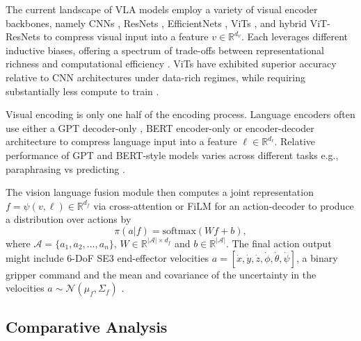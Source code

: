 The current landscape of \ac{VLA} models employ a variety of visual encoder backbones, namely \acp{CNN} \cite{MCIL2021,HULC2022,HULC++2022,PERACT2023, MTACT2024,OCTO2024}, ResNets \cite{CLIPORT2022,ACT3D2023,RVT2023,RVT22024,BCZ2022,ACT2023,DIFFPOLICY2023,SUDD2023, INTLANG2023, GATO2022}, EfficientNets \cite{QTRANSFORMER2023,RTTRAJ2023, RT12022}, \acp{ViT} \cite{LANGCOSTS2022,ROBOPOINT2024,VIMA2023,FLAMINGO2024,VOXPOSER2023,RTH2024,RTX2024, PI02024, OPENVLA2024, GR00T2025}, and hybrid \ac{ViT}-ResNets \cite{MDT2024} to compress visual input into a feature $v \in \mathbb R^{d_v}$. Each leverages different inductive biases, offering a spectrum of trade-offs between representational richness and computational efficiency \cite{VLASURVEY2025}. \acp{ViT} have exhibited superior accuracy relative to \ac{CNN} architectures under data-rich regimes, while requiring substantially less compute to train \cite{16x162021}. 

Visual encoding is only one half of the encoding process. Language encoders often use either a \ac{GPT} decoder-only \cite{CLIPORT2022, LANGCOSTS2022, INTLANG2023, PERACT2023, ACT3D2023, RVT2023, RVT22024, ROBOPOINT2024, FLAMINGO2024, VOXPOSER2023, SUDD2023, MDT2024}, \ac{BERT} encoder-only \cite{HULC2022, HULC++2022} or encoder-decoder \cite{BCZ2022, RT12022, QTRANSFORMER2023, VIMA2023, OCTO2024, RT22023, RTH2024, RTX2024} architecture to compress language input into a feature $\ell \in \mathbb R^{d_{\ell}}$. Relative performance of \ac{GPT} and \ac{BERT}-style models varies across different tasks e.g., paraphrasing vs predicting \cite{BERTGPT2023}.

The vision language fusion module then computes a joint representation $f = \psi(v, \ell) \in \mathbb R^{d_f}$ via cross-attention or \ac{FiLM} \cite{FiLM2017} for an action-decoder to produce a distribution over actions by 
\begin{equation*}
    \pi(a|f) = \text{softmax}\left(Wf+b\right),
\end{equation*}
where $\mathcal{A} = \{a_1, a_2, \ldots, a_{n}\}$, $W\in \mathbb R^{|\mathcal{A}|\times d_f}$ and $b \in \mathbb{R}^{|\mathcal{A}|}$. The final action output might include 6-\ac{DoF} \ac{SE3} end-effector velocities $a = [\dot{x}, \dot{y}, \dot{z}, \dot{\phi}, \dot{\theta}, \dot{\psi}]$, a binary gripper command \cite{RT22023} and the mean and covariance of the uncertainty in the velocities $a\sim \mathcal{N}(\mu_f, \Sigma_f)$ \cite{FLAMINGO2024, VOXPOSER2023}.

\subsection{Comparative Analysis}

